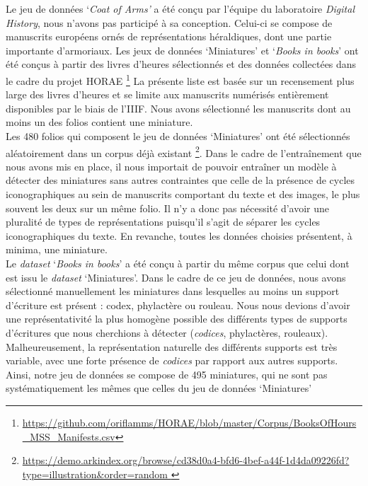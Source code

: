 \documentclass[12pt,twoside]{book}
\begin{document}
Le jeu de données ‘\textit{Coat of Arms’} a été conçu par l’équipe du laboratoire \textit{Digital History}, nous n’avons pas participé à sa conception. Celui-ci se compose de manuscrits européens ornés de représentations héraldiques, dont une partie importante d’armoriaux.
Les jeux de données ‘Miniatures’ et ‘\textit{Books in books}’ ont été conçus à partir des livres d’heures sélectionnés et des données collectées dans le cadre du projet HORAE \footnote{\url{https://github.com/oriflamms/HORAE/blob/master/Corpus/BooksOfHours_MSS_Manifests.csv}} La présente liste est basée sur un recensement plus large des livres d'heures et se limite aux manuscrits numérisés entièrement disponibles par le biais de l'IIIF. Nous avons sélectionné les manuscrits dont au moins un des folios contient une miniature.\\

Les 480 folios qui composent le jeu de données ‘Miniatures’ ont été sélectionnés aléatoirement dans un corpus déjà existant \footnote{\url{https://demo.arkindex.org/browse/cd38d0a4-bfd6-4bef-a44f-1d4da09226fd?type=illustration\&order=random }}. Dans le cadre de l’entraînement que nous avons mis en place, il nous importait de pouvoir entraîner un modèle à détecter des miniatures sans autres contraintes que celle de la présence de cycles iconographiques au sein de manuscrits comportant du texte et des images, le plus souvent les deux sur un même folio. Il n’y a donc pas nécessité d’avoir une pluralité de types de représentations puisqu'il s’agit de séparer les cycles iconographiques du texte. En revanche, toutes les données choisies présentent, à minima, une miniature. \\

Le \textit{dataset }‘\textit{Books in books}’ a été conçu à partir du même corpus que celui dont est issu le \textit{dataset} ‘Miniatures’. Dans le cadre de ce jeu de données, nous avons sélectionné manuellement les miniatures dans lesquelles au moins un support d’écriture est présent : codex, phylactère ou rouleau. Nous nous devions d’avoir une représentativité la plus homogène possible des différents types de supports d’écritures que nous cherchions à détecter (\textit{codices}, phylactères, rouleaux). Malheureusement, la représentation naturelle des différents supports est très variable, avec une forte présence de \textit{codices} par rapport aux autres supports. Ainsi, notre jeu de données se compose de 495 miniatures, qui ne sont pas systématiquement les mêmes que celles du jeu de données ‘Miniatures’
\end{document}
